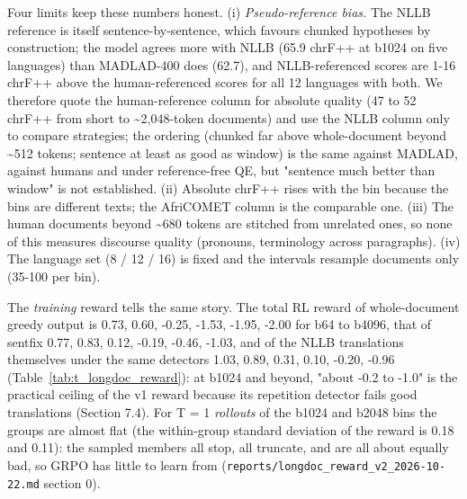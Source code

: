 Four limits keep these numbers honest. (i) \emph{Pseudo-reference bias.} The NLLB reference is itself sentence-by-sentence, which favours chunked hypotheses by construction; the model agrees more with NLLB (65.9 chrF++ at b1024 on five languages) than MADLAD-400 does (62.7), and NLLB-referenced scores are 1-16 chrF++ above the human-referenced scores for all 12 languages with both. We therefore quote the human-reference column for absolute quality (47 to 52 chrF++ from short to \textasciitilde2,048-token documents) and use the NLLB column only to compare strategies; the ordering (chunked far above whole-document beyond \textasciitilde512 tokens; sentence at least as good as window) is the same against MADLAD, against humans and under reference-free QE, but "sentence much better than window" is not established. (ii) Absolute chrF++ rises with the bin because the bins are different texts; the AfriCOMET column is the comparable one. (iii) The human documents beyond \textasciitilde680 tokens are stitched from unrelated ones, so none of this measures discourse quality (pronouns, terminology across paragraphs). (iv) The language set (8 / 12 / 16) is fixed and the intervals resample documents only (35-100 per bin).

The \emph{training} reward tells the same story. The total RL reward of whole-document greedy output is 0.73, 0.60, -0.25, -1.53, -1.95, -2.00 for b64 to b4096, that of sentfix 0.77, 0.83, 0.12, -0.19, -0.46, -1.03, and of the NLLB translations themselves under the same detectors 1.03, 0.89, 0.31, 0.10, -0.20, -0.96 (Table~\ref{tab:t_longdoc_reward}): at b1024 and beyond, "about -0.2 to -1.0" is the practical ceiling of the v1 reward because its repetition detector fails good translations (Section 7.4). For T = 1 \emph{rollouts} of the b1024 and b2048 bins the groups are almost flat (the within-group standard deviation of the reward is 0.18 and 0.11): the sampled members all stop, all truncate, and are all about equally bad, so GRPO has little to learn from (\texttt{reports/longdoc\_reward\_v2\_2026-10-22.md} section 0).

